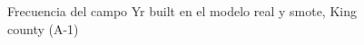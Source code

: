 \begin{figure}[H]
    \centering
    
    \caption{Frecuencia del campo Yr built en el modelo real y smote, King county (A-1)}
    \label{frecuency-smote-yr built}
\end{figure}
